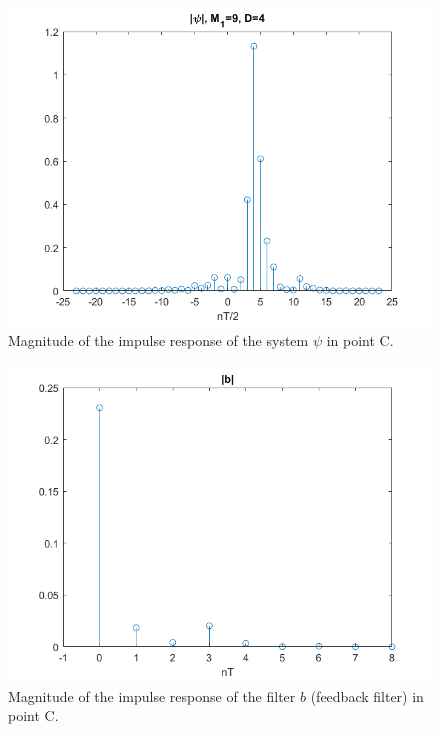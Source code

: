 \documentclass[a4paper,11.5pt]{article}
\begin{document}
\begin{figure}[ht]
	\begin{center}   
		\includegraphics[width=\textwidth]{figs/C_psi.png} 
		\caption{Magnitude of the impulse response of the system $\psi$ in point C.}
		\label{fig:C_psi}
	\end{center}
\end{figure}

\begin{figure}[ht]
	\begin{center}   
		\includegraphics[width=\textwidth]{figs/C_b.png} 
		\caption{Magnitude of the impulse response of the filter $b$ (feedback filter) in point C.}
		\label{fig:C_b}
	\end{center}
\end{figure}
\end{document}
